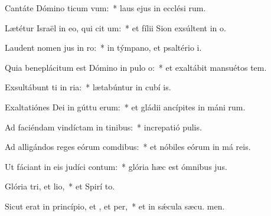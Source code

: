 \item Cantáte Dómino ticum vum:~* laus ejus in ecclési rum.
\item Lætétur Israël in eo, qui cit um:~* et fílii Sion exsúltent in  o.
\item Laudent nomen jus in ro:~* in týmpano, et psaltério  i.
\item Quia beneplácitum est Dómino in pulo o:~* et exaltábit mansuétos  tem.
\item Exsultábunt ti in ria:~* lætabúntur in cubí is.
\item Exaltatiónes Dei in gúttu erum:~* et gládii ancípites in máni rum.
\item Ad faciéndam vindíctam in tinibus:~* increpatió  pulis.
\item Ad alligándos reges eórum  comdibus:~* et nóbiles eórum in má reis.
\item Ut fáciant in eis judíci contum:~* glória hæc est ómnibus  jus.
\item Glória tri, et lio,~* et Spirí to.
\item Sicut erat in princípio, et , et per,~* et in sǽcula sæcu. men.
